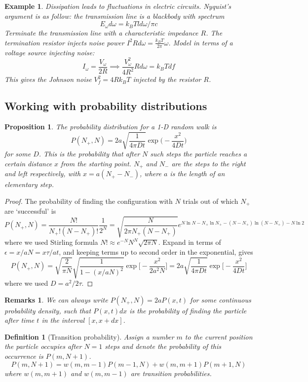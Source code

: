 \documentclass[a4paper]{article}
\newtheorem{eg}{Example}[section]
\newtheorem{remarks}{Remarks}[section]
\theoremstyle{new}
\newtheorem{defi}{Definition}[section]
\newtheorem{prop}{Proposition}[section]
\begin{document}
\begin{eg}
Dissipation leads to fluctuations in electric circuits. Nyquist's argument is as follow: the transmission line is a blackbody with spectrum
$$E_\omega d\omega=k_BTld\omega/\pi c$$
Terminate the transmission line with a characteristic impedance $R$. The termination resistor injects noise power $I^2Rd\omega=\frac{k_BT}{2\pi}\omega$. Model in terms of a voltage source injecting noise:
$$I_\omega=\frac{V_\omega}{2R}\implies\frac{V_\omega^2}{4R^2}Rd\omega=k_BTdf $$
This gives the Johnson noise $V_f^2=4Rk_BT$ injected by the resistor $R$.
\end{eg}
\newpage
\subsection{Working with probability distributions}
\begin{prop}
The probability distribution for a 1-D random walk is
$$P(N_+,N)=2a\sqrt{\frac{1}{4\pi Dt}}\exp\bigg(-\frac{x^2}{4Dt}\bigg)$$
for some $D$. This is the probability that after $N$ such steps the particle reaches a certain distance $x$ from the starting point. $N_+$ and $N_-$ are the steps to the right and left respectively, with $x=a(N_+-N_-)$, where $a$ is the length of an elementary step.
\end{prop}
\begin{proof}
The probability of finding the configuration with $N$ trials out of which $N_+$ are `successful' is
$$P(N_+,N)=\frac{N!}{N_+!(N-N_+)!}\frac{1}{2^N}=\sqrt{\frac{N}{2\pi N_+(N-N_+)}}e^{N\ln N-N_+\ln N_+-(N-N_+)\ln(N-N_+)-N\ln 2}$$
where we used Stirling formula $N!\approx e^{-N}N^N\sqrt{2\pi N}$. Expand in terms of $\epsilon=x/aN=x\tau/at$, and keeping terms up to second order in the exponential, gives
$$P(N_+,N)=\sqrt{\frac{2}{\pi N}}\sqrt{\frac{1}{1-(x/aN)^2}}\exp\bigg[-\frac{x^2}{2a^2N}\bigg]=2a\sqrt{\frac{1}{4\pi Dt}}\exp\bigg[-\frac{x^2}{4Dt}\bigg]$$
where we used $D=a^2/2\tau$. 
\end{proof}
\begin{remarks}
We can always write $P(N_+,N)=2aP(x,t)$ for some continuous probability density, such that $P(x,t)dx$ is the probability of finding the particle after time $t$ in the interval $[x,x+dx]$.
\end{remarks}
\begin{defi}[Transition probability]
Assign a number $m$ to the current position the particle occupies after $N=1$ steps and denote the probability of this occurrence is $P(m,N+1)$.
$$P(m,N+1)=w(m,m-1)P(m-1,N)+w(m,m+1)P(m+1,N)$$
where $w(m,m+1)$ and $w(m,m-1)$ are transition probabilities. 
\end{defi}
\end{document}
